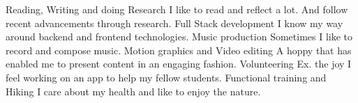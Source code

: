 

\begin{cvskills}

  \cvskill
    {Reading, Writing and doing Research} %
	{I like to read and reflect a lot. And follow recent advancements through research.}
  \cvskill
    {Full Stack development} %
	{I know my way around backend and frontend technologies.}
  \cvskill
    {Music production} %
	{Sometimes I like to record and compose music.}
  \cvskill
    {Motion graphics and Video editing} %
	{A hoppy that has enabled me to present content in an engaging fashion.}
  \cvskill
    {Volunteering} %
	{Ex. the joy I feel working on an app to help my fellow students.}
  \cvskill
    {Functional training and Hiking} %
	{I care about my health and like to enjoy the nature.}
\end{cvskills}
